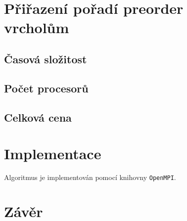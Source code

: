 \documentclass[12pt,a4paper]{article}
\begin{document}

\section{Přiřazení pořadí preorder vrcholům}
\label{sec:preorder}

\subsection*{Časová složitost}
\label{sub:casova_slozitost}

\subsection*{Počet procesorů}
\label{sub:pocet_procesoru}

\subsection*{Celková cena}
\label{sub:celkova_cena}

\section{Implementace}
\label{sec:implementace}
Algoritmus je implementován pomocí knihovny \texttt{OpenMPI}.

\section{Závěr}
\label{sec:závěr}
\end{document}
